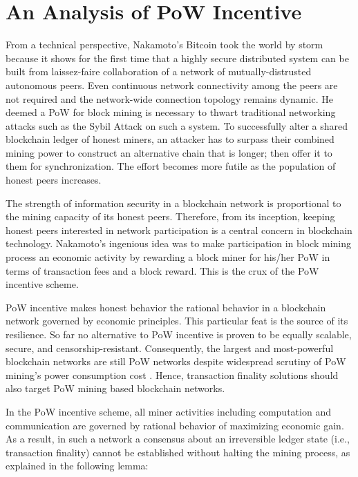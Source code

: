 \section{An Analysis of PoW Incentive}
\label{s-incentive}
From a technical perspective, Nakamoto's Bitcoin \cite{bitcoin} took the world by storm because it shows for the first time that a highly secure distributed system can be built from laissez-faire collaboration of a network of mutually-distrusted autonomous peers. Even continuous network connectivity among the peers are not required and the network-wide connection topology remains dynamic. He deemed a PoW for block mining is necessary to thwart traditional networking attacks such as the Sybil Attack \cite{Douceur:2002:SA:646334.687813} on such a system. To successfully alter a shared blockchain ledger of honest miners, an attacker has to surpass their combined mining power to construct an alternative chain that is longer; then offer it to them for synchronization. The effort becomes more futile as the population of honest peers increases.

The strength of information security in a blockchain network is proportional to the mining capacity of its honest peers. Therefore, from its inception, keeping honest peers interested in network participation is a central concern in blockchain technology. Nakamoto's ingenious idea was to make participation in block mining process an economic activity \cite{Kroll2013TheEO} by rewarding a block miner for his/her PoW in terms of transaction fees and a block reward. This is the crux of the PoW incentive scheme.

PoW incentive makes honest behavior the rational behavior \cite{bitcoin} in a blockchain network governed by economic principles. This particular feat is the source of its resilience. So far no alternative to PoW incentive is proven to be equally scalable, secure, and censorship-resistant. Consequently, the largest and most-powerful blockchain networks are still PoW networks despite widespread scrutiny of PoW mining's power consumption cost \cite{powcost}. Hence, transaction finality solutions should also target PoW mining based blockchain networks.

In the PoW incentive scheme, all miner activities including computation and communication are governed by rational behavior of maximizing economic gain. As a result, in such a network a consensus about an irreversible ledger state (i.e., transaction finality) cannot be established without halting the mining process, as explained in the following lemma:

